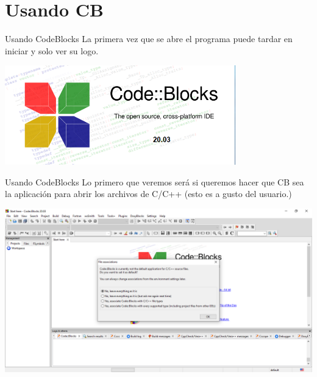 \documentclass[11pt]{beamer}
\begin{document}
\section{Usando CB}
\begin{frame}{Usando CodeBlocks}
    \justifying
    La primera vez que se abre el programa puede tardar en iniciar y solo ver su logo.
    
    \centering
    \includegraphics[width=0.75\textwidth]{cb15.png}
\end{frame}
\begin{frame}{Usando CodeBlocks}
    \justifying
    Lo primero que veremos será si queremos hacer que CB sea la aplicación para abrir los archivos de C/C++ (esto es a gusto del usuario.)
    
    \centering
    \includegraphics[width=\textwidth]{cb20.png}
\end{frame}
\end{document}
